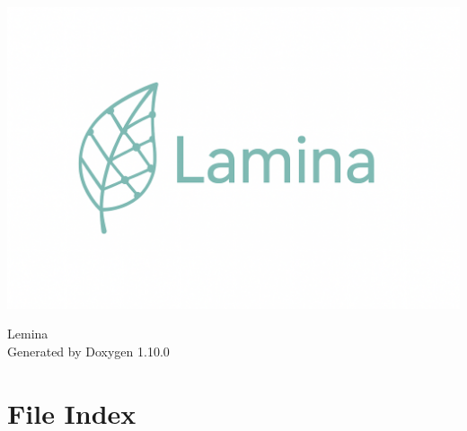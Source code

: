 \documentclass[twoside]{book}
\newcommand{\+}{\discretionary{\mbox{\scriptsize$\hookleftarrow$}}{}{}}
\newcommand{\clearemptydoublepage}{%
    \newpage{\pagestyle{empty}\cleardoublepage}%
  }
\begin{document}
  \raggedbottom
    \hypersetup{pageanchor=false,
                bookmarksnumbered=true,
                pdfencoding=unicode
               }
  \begin{titlepage}
 \begin{center}
    \includegraphics[width=\textwidth]{../../figures/LogoLaminaLatex.png} \\[1cm]
  \end{center}
  \vspace*{7cm}
  \begin{center}%
  {\Large Lemina}\\
  \vspace*{1cm}
  {\large Generated by Doxygen 1.10.0}\\
  \end{center}
  \end{titlepage}
  \clearemptydoublepage
  \tableofcontents
  \clearemptydoublepage
  \hypersetup{pageanchor=true}

\chapter{File Index}

\end{document}

